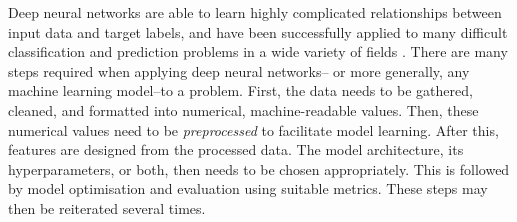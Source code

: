 \documentclass{statsmsc}
\begin{document}
{%






Deep neural networks are able to learn highly complicated
relationships between input data and target labels, and have been successfully
applied to many difficult classification and prediction problems in a wide
variety of fields \citep{dnn_survey}.
There are many steps required when applying deep neural networks--%
or more generally, any machine learning model--to a problem. First, 
the data needs to be gathered, cleaned, and formatted into numerical,
machine-readable values. Then, these numerical values need to be
\textit{preprocessed} to facilitate model learning.
After this, features are designed from the processed data.
The model architecture, its hyperparameters, or both, then needs to be
chosen appropriately. This is followed by model optimisation and
evaluation using suitable metrics. These steps may then be reiterated
several times.

}
\end{document}
